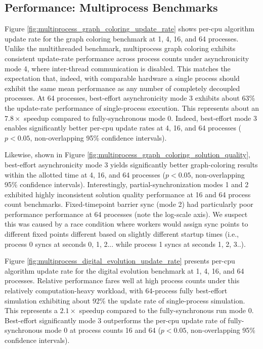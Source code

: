 \subsection{Performance: Multiprocess Benchmarks} \label{sec:multiprocess-benchmarks}



Figure \ref{fig:multiprocess_graph_coloring_update_rate} shows per-cpu algorithm update rate for the graph coloring benchmark at 1, 4, 16, and 64 processes.
Unlike the multithreaded benchmark, multiprocess graph coloring exhibits consistent update-rate performance across process counts under asynchronicity mode 4, where inter-thread communication is disabled.
This matches the expectation that, indeed, with comparable hardware a single process should exhibit the same mean performance as any number of completely decoupled processes.
At 64 processes, best-effort asynchronicity mode 3 exhibits about 63\% the update-rate performance of single-process execution.
This represents about an $7.8\times$ speedup compared to fully-synchronous mode 0.
Indeed, best-effort mode 3 enables significantly better per-cpu update rates at 4, 16, and 64 processes ($p < 0.05$, non-overlapping 95\% confidence intervals).

Likewise, shown in Figure \ref{fig:multiprocess_graph_coloring_solution_quality}, best-effort asynchronicity mode 3 yields significantly better graph-coloring results within the allotted time at 4, 16, and 64 processes ($p < 0.05$, non-overlapping 95\% confidence intervals).
Interestingly, partial-synchronization modes 1 and 2 exhibited highly inconsistent solution quality performance at 16 and 64 process count benchmarks.
Fixed-timepoint barrier sync (mode 2) had particularly poor performance performance at 64 processes (note the log-scale axis).
We suspect this was caused by a race condition where workers would assign sync points to different fixed points different based on slightly different startup times (i.e., process 0 syncs at seconds 0, 1, 2... while process 1 syncs at seconds 1, 2, 3..).

Figure \ref{fig:multiprocess_digital_evolution_update_rate} presents per-cpu algorithm update rate for the digital evolution benchmark at 1, 4, 16, and 64 processes.
Relative performance fares well at high process counts under this relatively computation-heavy workload, with 64-process fully best-effort simulation exhibiting about 92\% the update rate of single-process simulation.
This represents a $2.1\times$ speedup compared to the fully-synchronous run mode 0.
Best-effort significantly mode 3 outperforms the per-cpu update rate of fully-synchronous mode 0 at process counts 16 and 64 ($p < 0.05$, non-overlapping 95\% confidence intervals).

